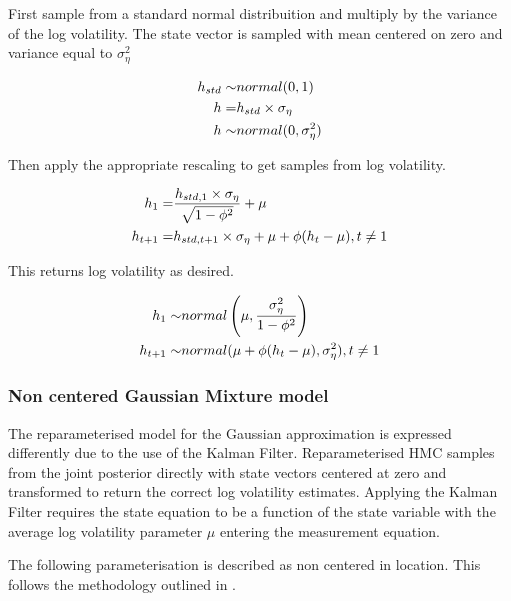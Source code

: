 \documentclass[12pt, a4paper]{article}
\begin{document}
        First sample from a standard normal distribuition and multiply by the variance of the log volatility. The state vector is sampled with mean centered on zero and variance equal to $\sigma_{\eta}^2$

        $$
        \begin{aligned}
        h_{std} \sim& \space normal(0,1) \\
        h =& h_{std} \times \sigma_{\eta} \\ 
        h \sim& normal(0, \sigma_{\eta}^2)
        \end{aligned}
        $$
        
        Then apply the appropriate rescaling to get samples from log volatility. 
        
        $$
        \begin{aligned}
        h_1 =& \space \frac{h_{std, 1}\times \sigma_{\eta}} {\sqrt{1 - \phi^2}} + \mu \\
        h_{t+1} =& \space h_{std, t+1}\times \sigma_{\eta} + \mu  + \phi(h_{t} - \mu),\space t\neq 1
        \end{aligned}
        $$
        
        This returns log volatility as desired.
        
        $$
        \begin{aligned}
        h_1 \sim& \space normal \left(\mu, \frac{\sigma_{\eta}^2}{1-\phi^2}\right) \\
        h_{t+1} \sim& \space normal(\mu +\phi(h_t - \mu) , \sigma_{\eta}^2), \space\space t\neq 1\\ 
        \end{aligned}
        $$

        \subsubsection{Non centered Gaussian Mixture model}
        The reparameterised model for the Gaussian approximation is expressed differently due to the use of the Kalman Filter. Reparameterised HMC samples from the joint posterior directly with state vectors centered at zero and transformed to return the correct log volatility estimates. Applying the Kalman Filter requires the state equation to be a function of the state variable with the average log volatility parameter $\mu$ entering the measurement equation.

        The following parameterisation is described as non centered in location. This follows the methodology outlined in \citet{strickland2008parameterisation}.
        
\end{document}

